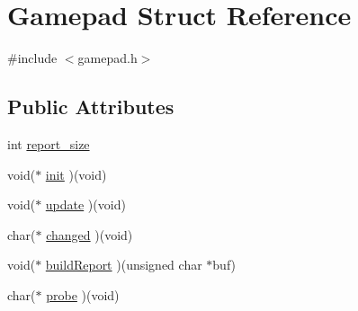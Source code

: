\hypertarget{structGamepad}{\section{Gamepad Struct Reference}
\label{structGamepad}
}


{\ttfamily \#include $<$gamepad.\-h$>$}

\subsection*{Public Attributes}
\begin{DoxyCompactItemize}
\item 
int \hyperlink{structGamepad_ac3bd57ce0da59a790922a091b5d71462}{report\-\_\-size}
\item 
void($\ast$ \hyperlink{structGamepad_ae77fcd29997e6b061793c5366d86e13d}{init} )(void)
\item 
void($\ast$ \hyperlink{structGamepad_a0efbe7e746fb47724e72ab89f442114b}{update} )(void)
\item 
char($\ast$ \hyperlink{structGamepad_a7fe2b8af15ce80e066d6aff5b6d8ff76}{changed} )(void)
\item 
void($\ast$ \hyperlink{structGamepad_a04602b8c82f9c76dd8c11702b7b005e0}{build\-Report} )(unsigned char $\ast$buf)
\item 
char($\ast$ \hyperlink{structGamepad_ae480cefcc3b44ce77354c784ed57e94e}{probe} )(void)
\end{DoxyCompactItemize}


